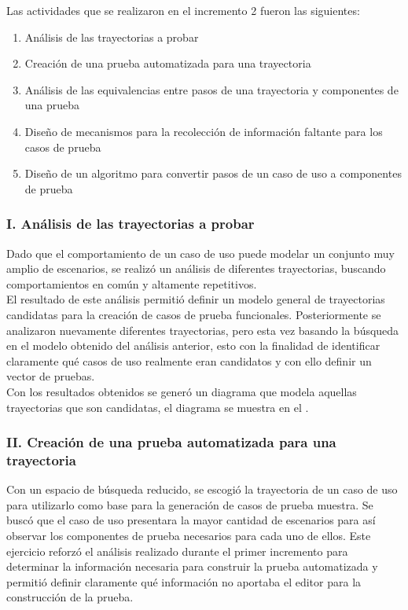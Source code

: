 Las actividades que se realizaron en el incremento 2 fueron las siguientes:

{\small
\begin{enumerate}[label=\Roman*.]
	\item Análisis de las trayectorias a probar
	\item Creación de una prueba automatizada para una trayectoria
	\item Análisis de las equivalencias entre pasos de una trayectoria y componentes de una prueba
	\item Diseño de mecanismos para la recolección de información faltante para los casos de prueba
	\item Diseño de un algoritmo para convertir pasos de un caso de uso a componentes de prueba
\end{enumerate}
}	
	
\subsubsection*{I. Análisis de las trayectorias a probar}

	Dado que el comportamiento de un caso de uso puede modelar un conjunto muy amplio de escenarios, se realizó un análisis de diferentes trayectorias, buscando comportamientos en común y altamente repetitivos.\\
	
	El resultado de este análisis permitió definir un modelo general de trayectorias candidatas para la creación de casos de prueba funcionales. Posteriormente se analizaron nuevamente diferentes trayectorias, pero esta vez basando la búsqueda en el modelo obtenido del análisis anterior, esto con la finalidad de identificar claramente qué casos de uso realmente eran candidatos y con ello definir un vector de pruebas.\\ 
	
	Con los resultados obtenidos se generó un diagrama que modela aquellas trayectorias que son candidatas, el diagrama se muestra en el .
	
\subsubsection*{II. Creación de una prueba automatizada para una trayectoria}

	Con un espacio de búsqueda reducido, se escogió la trayectoria de un caso de uso para utilizarlo como base para la generación de casos de prueba muestra. Se buscó que el caso de uso presentara la mayor cantidad de escenarios para así observar los componentes de prueba necesarios para cada uno de ellos. Este ejercicio reforzó el análisis realizado durante el primer incremento para determinar la información necesaria para construir la prueba automatizada y permitió definir claramente qué información no aportaba el editor para la construcción de la prueba.
	
